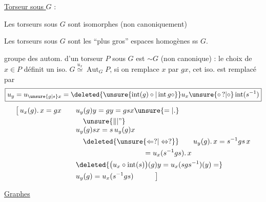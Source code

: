 \uline{Torseur sous $G$} :
{\small
{}}


Les torseurs sous $G$ sont isomorphes (non canoniquement)

Les torseurs sous $G$ sont les ``plus gros'' espaces homogènes ss $G$.

 groupe des autom. d'un torseur $P$ sous $G$ est $\sim G$ (non canonique) : le choix de $x\in P$ définit un iso. $G\overset{u_x}{\simeq}\operatorname{Aut}_{G}P$, si on remplace $x$ par $gx$, cet iso. est remplacé par
\[
\boxed{u_y=u_{\unsure{g|s}x}=\deleted{\unsure{\operatorname{int}(g)\circ|\operatorname{int}g\circ}}u_x\unsure{\circ\,?|\circ}\operatorname{int}(s^{-1})}
\]
{\small
\[
\begin{aligned}
\bigl[\,u_x(g).\,x=gx\qquad &u_y(g)y=gy=gsx\unsure{=|.}\\
&\quad\unsure{\Vert|\text{''}}\\[-3pt]
&u_y(g)sx=s\,u_y(g)x
\\
&\hspace{1em}\deleted{\unsure{\Leftarrow ?|\Leftrightarrow ?}} \qquad u_y(g).\,x=s^{-1}gs\,x\\
&\hspace{9.4em}=u_x(s^{-1}gs).\,x\\
&\deleted{\bigl(u_x\circ\operatorname{int}(s)\bigr)(g)y=u_x(sgs^{-1})(y)=}\\
&u_y(g)=u_x(s^{-1}gs)\hspace{3em}\bigr]
\end{aligned}
\]}

\uline{Graphes}

